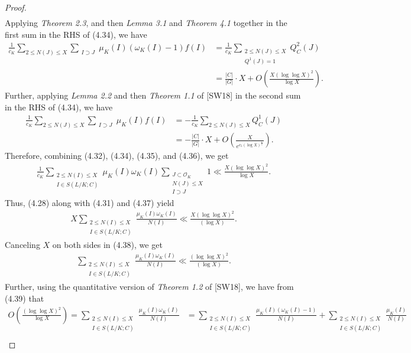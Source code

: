\documentclass[12pt]{article}
\numberwithin{equation}{section}
\numberwithin{equation}{section}
\begin{document}
\begin{proof}
\begin{align}
    \end{align}
    Applying \textit{Theorem 2.3}, and then \textit{Lemma 3.1} and \textit{Theorem 4.1} together in the first sum in the RHS of (4.34), we have
    \begin{align}
        \frac{1}{c_K}   \sum_{2\leq N(J)\leq X} \sum_{\substack{I\supset J}} \mu_K(I)(\omega_K(I)-1)f(I) &= \frac{1}{c_K} \sum_{\substack{2\leq N (J)\leq X \\ Q^1(J)=1}}Q_C^2(J) \nonumber \\
        &=  \frac{|C|}{|G|}\cdot X + O\left(\frac{X(\log\log X)^2}{\log X}\right).
    \end{align}
    Further, applying \textit{Lemma 2.2} and then \textit{Theorem 1.1} of [SW18] in the second sum in the RHS of (4.34), we have
    \begin{align}
        \frac{1}{c_K}   \sum_{2\leq N(J)\leq X}\sum_{\substack{I\supset J}} \mu_K(I)f(I)  &= -\frac{1}{c_K}   \sum_{2\leq N(J)\leq X} Q_C^1(J)  \nonumber \\
        &= -\frac{|C|}{|G|}\cdot X +O\left(\frac{X}{e^{c_5(\log X)^{\frac{1}{3}}}}\right).
    \end{align}
    Therefore, combining (4.32), (4.34), (4.35), and (4.36), we get
    \begin{align}
         \frac{1}{c_K}\sum_{\substack{2\leq N(I) \leq X \\ I \in S(L/K;C)}} \mu_K(I)\omega_K(I) \sum_{\substack{J \subset \mathcal{O}_K \\ N(J)\leq X \\ I \supset J  }}1 \ll \frac{X(\log\log X)^2}{\log X}.
    \end{align}
    Thus, (4.28) along with (4.31) and (4.37) yield
    \begin{align}
         X\sum_{\substack{2\leq N(I) \leq X \\ I \in S(L/K;C)}}\frac{\mu_K(I)\omega_K(I)}{N(I)}  \ll \frac{X(\log\log X)^2}{(\log X)}.
    \end{align}
    Canceling $X$ on both sides in (4.38), we get
    \begin{align}
        \sum_{\substack{2\leq N(I) \leq X \\ I \in S(L/K;C)}}\frac{\mu_K(I)\omega_K(I)}{N(I)}  \ll \frac{(\log\log X)^2}{(\log X)}.
    \end{align}
Further, using the quantitative version of \textit{Theorem 1.2} of [SW18], we have from (4.39) that
\begin{align}
    O\left(\frac{(\log\log X)^2}{\log X}\right) =  \sum_{\substack{2\leq N(I) \leq X \\ I \in S(L/K;C)}}\frac{\mu_K(I)\omega_K(I)}{N(I)}  &=  \sum_{\substack{2\leq N(I) \leq X \\ I \in S(L/K;C)}}\frac{\mu_K(I)(\omega_K(I)-1)}{N(I)} + \sum_{\substack{2\leq N(I) \leq X \\ I \in S(L/K;C)}}\frac{\mu_K(I)}{N(I)} \nonumber \\

\end{align}
\end{proof}
\end{document}

